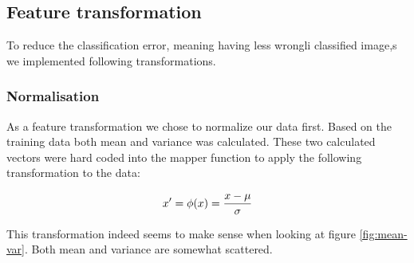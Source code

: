 \documentclass[a4paper, 11pt]{article}
\begin{document}
\subsection{Feature transformation}

To reduce the classification error, meaning having less wrongli classified
image,s we implemented following transformations.

\subsubsection{Normalisation}


As a feature transformation we chose to normalize our data first. Based on the
training data both mean and variance was calculated. These two calculated
vectors were hard coded into the mapper function to apply the following
transformation to the data:

$$ x' = \phi(x) = { {x - \mu} \over \sigma} $$ 

This transformation indeed seems to make sense when looking at figure
\ref{fig:mean-var}. Both mean and variance are somewhat scattered.
\end{document}
